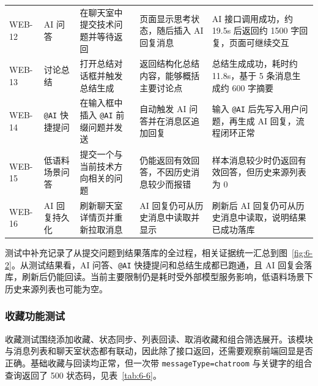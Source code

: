 \renewcommand{\arraystretch}{1.08}
\setlength{\tabcolsep}{0.55ex}
\small
\begin{longtable}{M{0.12\textwidth}p{0.16\textwidth}p{0.18\textwidth}p{0.18\textwidth}p{0.23\textwidth}}
WEB-12 & AI 问答 & 在聊天室中提交技术问题并等待返回 & 页面显示思考状态，随后插入 AI 回复消息 & AI 接口调用成功，约 19.5s 后返回约 1500 字回复，页面可继续交互 \\
WEB-13 & 讨论总结 & 打开总结对话框并触发总结生成 & 返回结构化总结内容，能够概括主要讨论点 & 总结生成成功，耗时约 11.8s，基于 5 条消息生成约 600 字摘要 \\
WEB-14 & \texttt{@AI} 快捷提问 & 在输入框中插入 \texttt{@AI} 前缀问题并发送 & 自动触发 AI 问答并在消息区追加回复 & 输入 \texttt{@AI} 后先写入用户问题，再生成 AI 回复，流程闭环正常 \\
WEB-15 & 低语料场景问答 & 提交一个与当前技术方向相关的问题 & 仍能返回有效回答，不因历史消息较少而报错 & 样本消息较少时仍返回有效回答，但历史来源列表为 0 \\
WEB-16 & AI 回复持久化 & 刷新聊天室详情页并重新拉取消息 & AI 回复仍可从历史消息中读取并显示 & 刷新后 AI 回复仍可从历史消息中读取，说明结果已成功落库 \\
\end{longtable}
\normalsize
\FloatBarrier

测试中补充记录了从提交问题到结果落库的全过程，相关证据统一汇总到图~\ref{fig:6-2}。从测试结果看，AI 问答、\texttt{@AI} 快捷提问和总结生成都已跑通，且 AI 回复会落库，刷新后仍能回读。当前主要限制仍是耗时受外部模型服务影响，低语料场景下历史来源列表也可能为空。

\subsubsection{收藏功能测试}

收藏测试围绕添加收藏、状态同步、列表回读、取消收藏和组合筛选展开。该模块与消息列表和聊天室状态都有联动，因此除了接口返回，还需要观察前端回显是否正确。基础收藏与回读均正常，但一次带 \texttt{messageType=chatroom} 与关键字的组合查询返回了 500 状态码，见表~\ref{tab:6-6}。

